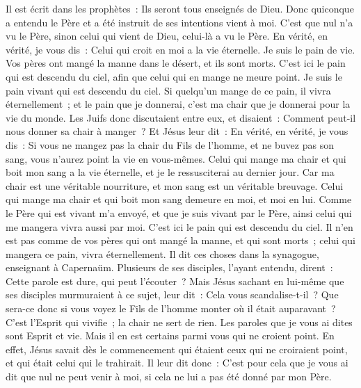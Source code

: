 \begin{multicols}{2}
Il est écrit dans les prophètes~: Ils seront tous enseignés de Dieu. Donc quiconque a entendu le Père et a été instruit de ses intentions vient à moi.
C'est que nul n'a vu le Père, sinon celui qui vient de Dieu, celui-là a vu le Père.
En vérité, en vérité, je vous dis~: Celui qui croit en moi a la vie éternelle.
Je suis le pain de vie.
Vos pères ont mangé la manne dans le désert, et ils sont morts.
C'est ici le pain qui est descendu du ciel, afin que celui qui en mange ne meure point.
Je suis le pain vivant qui est descendu du ciel. Si quelqu'un mange de ce pain, il vivra éternellement~; et le pain que je donnerai, c'est ma chair que je donnerai pour la vie du monde.
Les Juifs donc discutaient entre eux, et disaient~: Comment peut-il nous donner sa chair à manger~?
Et Jésus leur dit~: En vérité, en vérité, je vous dis~: Si vous ne mangez pas la chair du Fils de l'homme, et ne buvez pas son sang, vous n'aurez point la vie en vous-mêmes.
Celui qui mange ma chair et qui boit mon sang a la vie éternelle, et je le ressusciterai au dernier jour.
Car ma chair est une véritable nourriture, et mon sang est un véritable breuvage.
Celui qui mange ma chair et qui boit mon sang demeure en moi, et moi en lui.
Comme le Père qui est vivant m'a envoyé, et que je suis vivant par le Père, ainsi celui qui me mangera vivra aussi par moi.
C'est ici le pain qui est descendu du ciel. Il n'en est pas comme de vos pères qui ont mangé la manne, et qui sont morts~; celui qui mangera ce pain, vivra éternellement.
Il dit ces choses dans la synagogue, enseignant à Capernaüm.
Plusieurs de ses disciples, l'ayant entendu, dirent~: Cette parole est dure, qui peut l'écouter~?
Mais Jésus sachant en lui-même que ses disciples murmuraient à ce sujet, leur dit~: Cela vous scandalise-t-il~?
Que sera-ce donc si vous voyez le Fils de l'homme monter où il était auparavant~?
C'est l'Esprit qui vivifie~; la chair ne sert de rien. Les paroles que je vous ai dites sont Esprit et vie.
Mais il en est certains parmi vous qui ne croient point. En effet, Jésus savait dès le commencement qui étaient ceux qui ne croiraient point, et qui était celui qui le trahirait.
Il leur dit donc~: C'est pour cela que je vous ai dit que nul ne peut venir à moi, si cela ne lui a pas été donné par mon Père.

\end{multicols}
